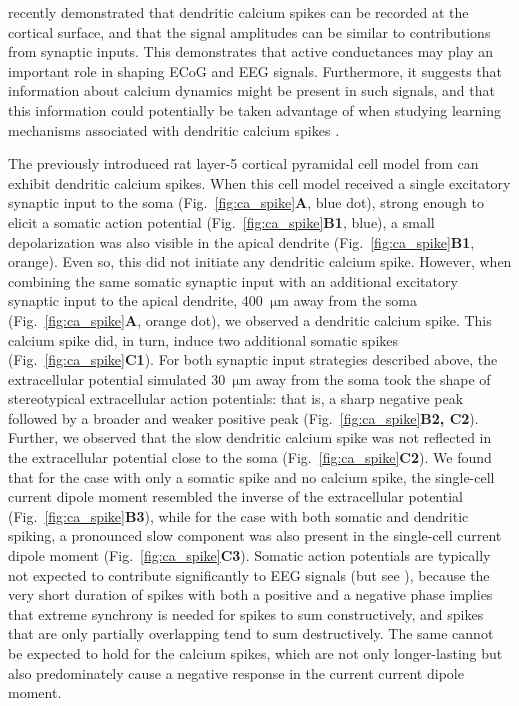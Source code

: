 \documentclass[preprint,10pt,authoryear]{elsarticle}
\newcommand{\sntxt}[1]{{\color{NavyBlue}#1}}
\newcommand{\tvntxt}[1]{{\color{Emerald}#1}}
\begin{document}
\cite{SUZUKI2017} recently demonstrated that dendritic calcium spikes can be recorded at the cortical surface, and that the signal amplitudes can be similar to contributions from synaptic inputs.
This demonstrates that active conductances may play an important role in shaping ECoG and EEG signals. Furthermore, it suggests that information about calcium dynamics might be present in such signals, and that this information could potentially be taken advantage of when studying learning mechanisms associated with dendritic calcium spikes \citep{SUZUKI2017}.

The previously introduced rat layer-5 cortical pyramidal cell model from \cite{HAY2011} can exhibit dendritic calcium spikes.
When this cell model received a single excitatory synaptic input to the soma (Fig.~\ref{fig:ca_spike}\textbf{A}, blue dot), strong enough to elicit a somatic action potential (Fig.~\ref{fig:ca_spike}\textbf{B1}, blue), a small depolarization was also visible in the apical dendrite (Fig.~\ref{fig:ca_spike}\textbf{B1}, orange). Even so, this did not initiate any dendritic calcium spike. However, when combining the same somatic synaptic input with an additional excitatory synaptic input to the apical dendrite, 400~$\si{\um}$ away from the soma (Fig.~\ref{fig:ca_spike}\textbf{A}, orange dot), we observed a dendritic calcium spike. This calcium spike did, in turn, induce two additional somatic spikes (Fig.~\ref{fig:ca_spike}\textbf{C1}).
For both synaptic input strategies described above, the extracellular potential simulated 30~$\si{\um}$ away from the soma took the shape of stereotypical extracellular action potentials: that is, a sharp negative peak followed by a broader and weaker positive peak (Fig.~\ref{fig:ca_spike}\textbf{B2, C2}). Further, we observed that the slow dendritic calcium spike was not reflected in the extracellular potential close to the soma (Fig.~\ref{fig:ca_spike}\textbf{C2}).
We found that for the case with only a somatic spike and no calcium spike, the single-cell current dipole moment resembled the inverse of the extracellular potential (Fig.~\ref{fig:ca_spike}\textbf{B3}), while for the case with both somatic and dendritic spiking, a pronounced slow component was also present in the single-cell current dipole moment (Fig.~\ref{fig:ca_spike}\textbf{C3}).
Somatic action potentials are typically not expected to contribute significantly to EEG signals (but see \cite{TELENCZUK2015}), because the very short duration of spikes with both a positive and a negative phase implies that extreme synchrony is needed for spikes to sum constructively, and spikes that are only partially overlapping tend to sum destructively. The same cannot be expected to hold for the calcium spikes, which are not only longer-lasting but also predominately cause a negative response in the current current dipole moment. 
\end{document}
